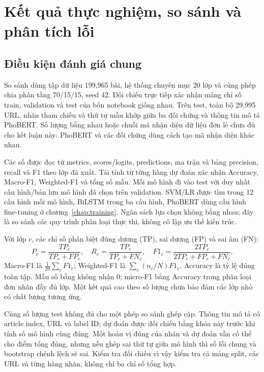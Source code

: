 \chapter{Kết quả thực nghiệm, so sánh và phân tích lỗi}
\label{chap:experiments}\label{chap:results}\label{chap:comparison}
\FloatBarrier
\section{Điều kiện đánh giá chung}

So sánh dùng tập dữ liệu 199,965 bài, hệ thống chuyên mục 20 lớp và cùng phép chia phân tầng 70/15/15, seed 42. Đối chiếu trực tiếp xác nhận mảng chỉ số train, validation và test của bốn notebook giống nhau. Trên test, toàn bộ 29,995 URL, nhãn tham chiếu và thứ tự mẫu khớp giữa ba đối chứng và thông tin mô tả PhoBERT. Số lượng bằng nhau hoặc chuỗi mã nhận diện dữ liệu đơn lẻ chưa đủ cho kết luận này: PhoBERT và các đối chứng dùng cách tạo mã nhận diện khác nhau.

Các số được đọc từ metrics, scores/logits, predictions, ma trận và bảng precision, recall và F1 theo lớp đã xuất. Tái tính từ từng hàng dự đoán xác nhận Accuracy, Macro-F1, Weighted-F1 và tổng số mẫu. Mỗi mô hình đi vào test với duy nhất cấu hình/bản lưu mô hình đã chọn trên validation. SVM/LR được tìm trong 12 cấu hình mỗi mô hình, BiLSTM trong ba cấu hình, PhoBERT dùng cấu hình fine-tuning ở chương~\ref{chap:training}. Ngân sách lựa chọn không bằng nhau; đây là so sánh các quy trình phân loại thực thi, không cô lập ưu thế kiến trúc.


Với lớp $c$, các chỉ số phân biệt đúng dương (TP), sai dương (FP) và sai âm (FN):
\begin{equation}P_c=\frac{TP_c}{TP_c+FP_c},\quad R_c=\frac{TP_c}{TP_c+FN_c},\quad F1_c=\frac{2TP_c}{2TP_c+FP_c+FN_c}.\end{equation}
Macro-F1 là $\frac1{20}\sum_c F1_c$; Weighted-F1 là $\sum_c(n_c/N)F1_c$. Accuracy là tỷ lệ đúng toàn tập. Mẫu số bằng không nhận 0; micro-F1 bằng Accuracy trong phân loại đơn nhãn đầy đủ lớp. Một kết quả cao theo số lượng chưa bảo đảm các lớp nhỏ có chất lượng tương ứng.



Cùng số lượng test không đủ cho một phép so sánh ghép cặp. Thông tin mô tả có article index, URL và label ID; dự đoán được đối chiếu bằng khóa này trước khi tính số mô hình cùng đúng. Một hoán vị đúng của nhãn và dự đoán vẫn có thể cho điểm tổng đúng, nhưng nếu ghép sai thứ tự giữa mô hình thì số lỗi chung và bootstrap chênh lệch sẽ sai. Kiểm tra đối chiếu vì vậy kiểm tra cả mảng split, các URL và từng hàng nhãn, không chỉ ba chỉ số tổng hợp.

